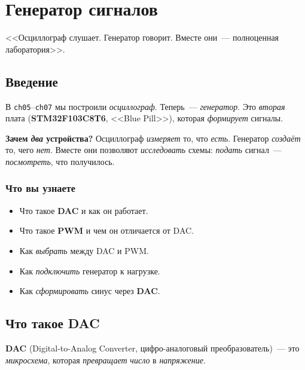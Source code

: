 
\chapter{Генератор сигналов}
\label{ch:generator}

\epigraph{<<Осциллограф слушает. Генератор говорит.
Вместе они~--- полноценная лаборатория>>.}{}

\section{Введение}
\label{sec:gen-intro}

В \texttt{ch05}--\texttt{ch07} мы построили \emph{осциллограф}.
Теперь~--- \emph{генератор}. Это \emph{вторая} плата
(\textbf{STM32F103C8T6}, <<Blue Pill>>), которая
\emph{формирует} сигналы.

\begin{ideabox}
\textbf{Зачем \emph{два} устройства?} Осциллограф \emph{измеряет}
то, что \emph{есть}. Генератор \emph{создаёт} то, чего
\emph{нет}. Вместе они позволяют \emph{исследовать}
схемы: \emph{подать} сигнал~--- \emph{посмотреть}, что
получилось.
\end{ideabox}

\subsection{Что вы узнаете}

\begin{itemize}
    \item Что такое \textbf{DAC} и как он работает.
    \item Что такое \textbf{PWM} и чем он отличается от DAC.
    \item Как \emph{выбрать} между DAC и PWM.
    \item Как \emph{подключить} генератор к нагрузке.
    \item Как \emph{сформировать} синус через \textbf{DAC}.
\end{itemize}

\section{Что такое DAC}
\label{sec:gen-dac}

\textbf{DAC} (Digital-to-Analog Converter, цифро-аналоговый
преобразователь)~--- это \emph{микросхема}, которая
\emph{превращает} \emph{число} в \emph{напряжение}.

